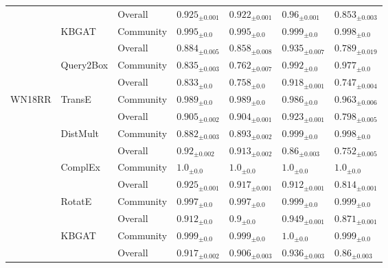 \begin{table}[hb!]
\begin{adjustbox}{width=\textwidth}
\begin{tabular}{lllllll}
         &           & Overall &  ${{0.925}_{\pm 0.001}}$ &  ${{0.922}_{\pm 0.001}}$ &   ${{0.96}_{\pm 0.001}}$ &  ${{0.853}_{\pm 0.003}}$ \\
         & KBGAT & Community &    ${{0.995}_{\pm 0.0}}$ &    ${{0.995}_{\pm 0.0}}$ &    ${{0.999}_{\pm 0.0}}$ &    ${{0.998}_{\pm 0.0}}$ \\
         &           & Overall &  ${{0.884}_{\pm 0.005}}$ &  ${{0.858}_{\pm 0.008}}$ &  ${{0.935}_{\pm 0.007}}$ &  ${{0.789}_{\pm 0.019}}$ \\
         & Query2Box & Community &  ${{0.835}_{\pm 0.003}}$ &  ${{0.762}_{\pm 0.007}}$ &    ${{0.992}_{\pm 0.0}}$ &    ${{0.977}_{\pm 0.0}}$ \\
         &           & Overall &    ${{0.833}_{\pm 0.0}}$ &    ${{0.758}_{\pm 0.0}}$ &  ${{0.918}_{\pm 0.001}}$ &  ${{0.747}_{\pm 0.004}}$ \\
\midrule
WN18RR & TransE & Community &    ${{0.989}_{\pm 0.0}}$ &    ${{0.989}_{\pm 0.0}}$ &    ${{0.986}_{\pm 0.0}}$ &  ${{0.963}_{\pm 0.006}}$ \\
         &           & Overall &  ${{0.905}_{\pm 0.002}}$ &  ${{0.904}_{\pm 0.001}}$ &  ${{0.923}_{\pm 0.001}}$ &  ${{0.798}_{\pm 0.005}}$ \\
         & DistMult & Community &  ${{0.882}_{\pm 0.003}}$ &  ${{0.893}_{\pm 0.002}}$ &    ${{0.999}_{\pm 0.0}}$ &    ${{0.998}_{\pm 0.0}}$ \\
         &           & Overall &   ${{0.92}_{\pm 0.002}}$ &  ${{0.913}_{\pm 0.002}}$ &   ${{0.86}_{\pm 0.003}}$ &  ${{0.752}_{\pm 0.005}}$ \\
         & ComplEx & Community &      ${{1.0}_{\pm 0.0}}$ &      ${{1.0}_{\pm 0.0}}$ &      ${{1.0}_{\pm 0.0}}$ &      ${{1.0}_{\pm 0.0}}$ \\
         &           & Overall &  ${{0.925}_{\pm 0.001}}$ &  ${{0.917}_{\pm 0.001}}$ &  ${{0.912}_{\pm 0.001}}$ &  ${{0.814}_{\pm 0.001}}$ \\
         & RotatE & Community &    ${{0.997}_{\pm 0.0}}$ &    ${{0.997}_{\pm 0.0}}$ &    ${{0.999}_{\pm 0.0}}$ &    ${{0.999}_{\pm 0.0}}$ \\
         &           & Overall &    ${{0.912}_{\pm 0.0}}$ &      ${{0.9}_{\pm 0.0}}$ &  ${{0.949}_{\pm 0.001}}$ &  ${{0.871}_{\pm 0.001}}$ \\
         & KBGAT & Community &    ${{0.999}_{\pm 0.0}}$ &    ${{0.999}_{\pm 0.0}}$ &      ${{1.0}_{\pm 0.0}}$ &    ${{0.999}_{\pm 0.0}}$ \\
         &           & Overall &  ${{0.917}_{\pm 0.002}}$ &  ${{0.906}_{\pm 0.003}}$ &  ${{0.936}_{\pm 0.003}}$ &   ${{0.86}_{\pm 0.003}}$ \\

\end{tabular}
\end{adjustbox}
\end{table}
